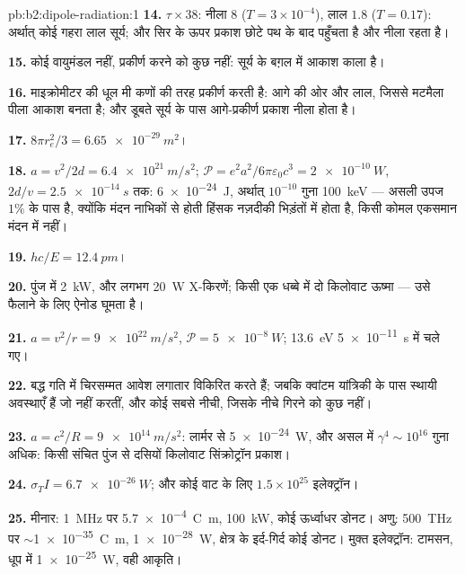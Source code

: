 \begin{solution}{pb:b2:dipole-radiation:1}
\textbf{14.} $\tau \times 38$: नीला $8$ ($T = 3 \times 10^{-4}$), लाल $1.8$ ($T = 0.17$): अर्थात् कोई
गहरा लाल सूर्य; और सिर के ऊपर प्रकाश छोटे पथ के बाद पहुँचता है और नीला रहता है।

\textbf{15.} कोई वायुमंडल नहीं, प्रकीर्ण करने को कुछ नहीं: सूर्य के बग़ल में
आकाश काला है।

\textbf{16.} माइक्रोमीटर की धूल मी कणों की तरह प्रकीर्ण करती है: आगे की ओर और
लाल, जिससे मटमैला पीला आकाश बनता है; और डूबते सूर्य के पास
आगे-प्रकीर्ण प्रकाश नीला होता है।

\textbf{17.} $8\pi r_e^2/3 = \qty{6.65e-29}{m^2}$।

\textbf{18.} $a = v^2/2d = \qty{6.4e21}{m/s^2}$; $\mathcal P = e^2a^2/6\pi\varepsilon_0c^3 =
\qty{2e-10}{W}$, $2d/v = \qty{2.5e-14}{s}$ तक: \qty{6e-24}{J}, अर्थात् $10^{-10}$ गुना
\qty{100}{keV} --- असली उपज $1\%$ के पास है, क्योंकि मंदन नाभिकों से होती
हिंसक नज़दीकी भिड़ंतों में होता है, किसी कोमल एकसमान
मंदन में नहीं।

\textbf{19.} $hc/E = \qty{12.4}{pm}$।

\textbf{20.} पुंज में \qty{2}{kW}, और लगभग \qty{20}{W} X-किरणें; किसी एक धब्बे में दो
किलोवाट ऊष्मा --- उसे फैलाने के लिए ऐनोड घूमता है।

\textbf{21.} $a = v^2/r = \qty{9e22}{m/s^2}$, $\mathcal P = \qty{5e-8}{W}$; \qty{13.6}{eV} \qty{5e-11}{s}
में चले गए।

\textbf{22.} बद्ध गति में चिरसम्मत आवेश लगातार विकिरित करते हैं;
जबकि क्वांटम यांत्रिकी के पास स्थायी अवस्थाएँ हैं जो नहीं करतीं, और कोई सबसे
नीची, जिसके नीचे गिरने को कुछ नहीं।

\textbf{23.} $a = c^2/R = \qty{9e14}{m/s^2}$: लार्मर से \qty{5e-24}{W}, और असल में $\gamma^4 \sim 10^{16}$
गुना अधिक: किसी संचित पुंज से दसियों किलोवाट सिंक्रोट्रॉन
प्रकाश।

\textbf{24.} $\sigma_TI = \qty{6.7e-26}{W}$; और कोई वाट के लिए $1.5 \times 10^{25}$ इलेक्ट्रॉन।

\textbf{25.} मीनार: \qty{1}{MHz} पर \qty{5.7e-4}{C.m}, \qty{100}{kW}, कोई ऊर्ध्वाधर
डोनट। अणु: \qty{500}{THz} पर $\sim$\qty{1e-35}{C.m}, \qty{1e-28}{W},
क्षेत्र के इर्द-गिर्द कोई डोनट। मुक्त इलेक्ट्रॉन: टामसन, धूप में
\qty{1e-25}{W}, वही आकृति।
\end{solution}
